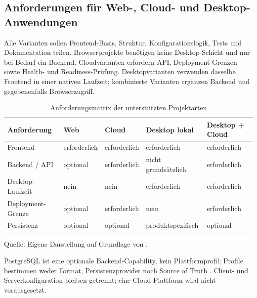 \subsection{Anforderungen für Web-, Cloud- und Desktop-Anwendungen}
\label{subsec:anforderungen-plattformen}

Alle Varianten sollen Frontend-Basis, Struktur, Konfigurationslogik, Tests und
Dokumentation teilen. Browserprojekte benötigen keine Desktop-Schicht und nur
bei Bedarf ein Backend. Cloudvarianten erfordern API, Deployment-Grenzen sowie
Health- und Readiness-Prüfung. Desktopvarianten verwenden dasselbe Frontend in
einer nativen Laufzeit; kombinierte Varianten ergänzen Backend und
gegebenenfalls Browserzugriff.

\begin{table}[H]
  \centering
  \scriptsize
  \renewcommand{\arraystretch}{1.08}
  \caption{Anforderungsmatrix der unterstützten Projektarten}
  \label{tab:plattform-anforderungen}
  \begin{tabularx}{\textwidth}{@{}p{}>{\centering\arraybackslash}X>{\centering\arraybackslash}X>{\centering\arraybackslash}X>{\centering\arraybackslash}X@{}}
    \toprule
    \textbf{Anforderung} & \textbf{Web} & \textbf{Cloud} & \textbf{Desktop lokal} & \textbf{Desktop + Cloud} \\
    \midrule
    Frontend & erforderlich & erforderlich & erforderlich & erforderlich \\
    Backend / API & optional & erforderlich & nicht grundsätzlich & erforderlich \\
    Desktop-Laufzeit & nein & nein & erforderlich & erforderlich \\
    Deployment-Grenze & optional & erforderlich & nein & erforderlich \\
    Persistenz & optional & optional & produktspezifisch & optional \\
    \bottomrule
  \end{tabularx}
  \smallskip
  {\footnotesize Quelle: Eigene Darstellung auf Grundlage von
  \textcite{kleiveist2026profiles}.\par}
\end{table}

PostgreSQL ist eine optionale Backend-Capability, kein Plattformprofil; Profile
bestimmen weder Format, Persistenzprovider noch Source of Truth
\parencite{kleiveist2026profiles,kleiveist2026persistence}. Client- und
Serverkonfiguration bleiben getrennt; eine Cloud-Plattform wird nicht
vorausgesetzt.
